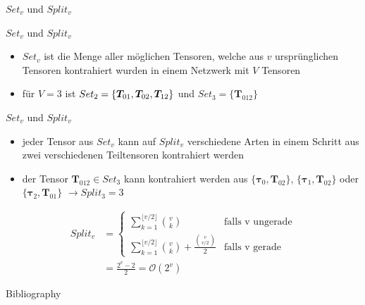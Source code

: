 \documentclass{beamer}
\begin{document}
	\begin{section}{$Set_v$ und $Split_v$}

		\begin{frame}{$Set_v$ und $Split_v$}
			\begin{itemize}
				\item $Set_v$ ist die Menge aller möglichen Tensoren, welche aus $v$ ursprünglichen Tensoren kontrahiert wurden in einem Netzwerk mit $V$ Tensoren
				\item für $V = 3$ ist $Set_2 = \{\bm{T}_{01}, \bm{T_}{02}, \bm{T}_{12} \}$ und $Set_3 = \{\bm{T}_{012} \}$
			\end{itemize}
		\end{frame}

		\begin{frame}{$Set_v$ und $Split_v$}
			\begin{itemize}
				\item jeder Tensor aus $Set_v$ kann auf $Split_v$ verschiedene Arten in einem Schritt aus zwei verschiedenen Teiltensoren kontrahiert werden
				\item der Tensor $\bm{T}_{012} \in Set_3$ kann kontrahiert werden aus $\{\bm{\tau}_0, \bm{T}_{02} \}$, $\{\bm{\tau}_{1}, \bm{T}_{02} \}$ oder $\{\bm{\tau}_{2}, \bm{T}_{01} \}$ $\rightarrow Split_3 = 3$
			\end{itemize}
			\begin{align*}
				Split_v &= \begin{cases}
					\sum^{\lfloor v/2 \rfloor}_{k=1} \binom{v}{k} &\text{falls v ungerade} \\
					\sum^{\lfloor v/2 \rfloor}_{k=1} \binom{v}{k} + \frac{\binom{v}{v/2}}{2} & \text{falls v gerade}
				\end{cases} \\
				&= \frac{2^v - 2}{2} = \mathcal{O}(2^v)
			\end{align*}
		\end{frame}

	\end{section}
	
	
	
	
	
	\begin{frame}[allowframebreaks]{Bibliography}
		
		
	\end{frame}
	
\end{document}

